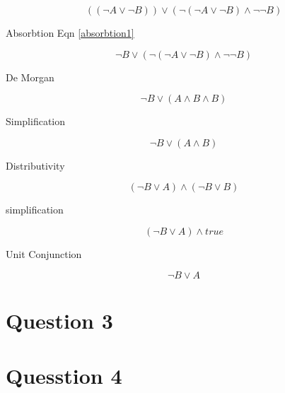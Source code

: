 \documentclass[10pt,a4paper]{article}
\begin{document}
\begin{equation}
((\neg A \vee \neg B)) \vee (\neg(\neg A \vee \neg B) \wedge \neg\neg B)
\end{equation}

Absorbtion Eqn \ref{absorbtion1}

\begin{equation}
 \neg B \vee  (\neg(\neg A \vee \neg B) \wedge \neg\neg B)
\end{equation}

De Morgan

\begin{equation}
 \neg B \vee  ( A \wedge B \wedge  B)
\end{equation}

Simplification 

\begin{equation}
 \neg B \vee  ( A \wedge B)
\end{equation}

Distributivity

\begin{equation}
(\neg B \vee A) \wedge (\neg B \vee B) 
\end{equation}

simplification

\begin{equation}
(\neg B \vee A) \wedge true 
\end{equation}

Unit Conjunction 

\begin{equation}
\neg B \vee A 
\end{equation}



\section{Question 3}

\section{Quesstion 4}
\end{document}
